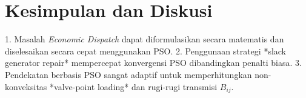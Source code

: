 \documentclass[11pt,a4paper]{article}
\begin{document}
\section{Kesimpulan dan Diskusi}
1. Masalah \textit{Economic Dispatch} dapat diformulasikan secara matematis dan diselesaikan secara cepat menggunakan PSO.
2. Penggunaan strategi *slack generator repair* mempercepat konvergensi PSO dibandingkan penalti biasa.
3. Pendekatan berbasis PSO sangat adaptif untuk memperhitungkan non-konveksitas *valve-point loading* dan rugi-rugi transmisi $B_{ij}$.
\end{document}
